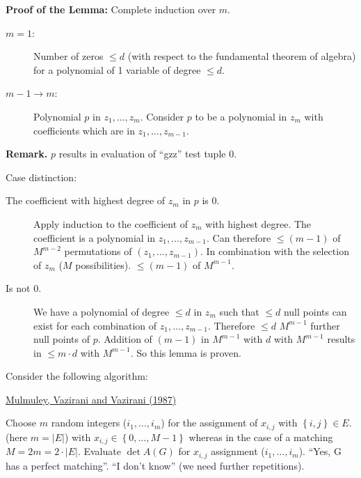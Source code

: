 \documentclass[a4paper]{article}
\newcommand{\set}[1]{\left\{#1\right\}}
\begin{document}
\textbf{Proof of the Lemma:} Complete induction over $m$.
\begin{description}
  \item[$m=1$:]
    Number of zeros $\leq d$ (with respect to the fundamental theorem of algebra)
    for a polynomial of 1 variable of degree $\leq d$.
  \item[$m-1 \rightarrow m$:]
    Polynomial $p$ in $z_1, \ldots, z_m$. Consider $p$ to be a polynomial in $z_m$ with coefficients
    which are in $z_1, \ldots, z_{m-1}$.
\end{description}

\textbf{Remark.}
  $p$ results in evaluation of ``gzz'' test tuple 0.

Case distinction:
\begin{description}
  \item[The coefficient with highest degree of $z_m$ in $p$ is 0.]
    Apply induction to the coefficient of $z_m$ with highest degree.
    The coefficient is a polynomial in $z_1, \ldots, z_{m-1}$.
    Can therefore $\leq (m-1)$ of $M^{m-2}$ permutations of $(z_1, \ldots, z_{m-1})$.
    In combination with the selection of $z_m$ ($M$ possibilities).
    $\leq (m-1)$ of $M^{m-1}$.
  \item[Is not $0$.]
    We have a polynomial of degree $\leq d$ in $z_m$ such that $\leq d$ null points
    can exist for each combination of $z_1, \ldots, z_{m-1}$.
    Therefore $\leq d$ $M^{m-1}$ further null points of $p$.
    Addition of $(m-1)$ in $M^{m-1}$ with $d$ with $M^{m-1}$ results in $\leq m\cdot d$ with $M^{m-1}$.
    So this lemma is proven.
\end{description}

Consider the following algorithm:
\begin{algorithm}
\caption{\href{http://www.cs.cmu.edu/afs/cs/academic/class/15859-f04/www/scribes/lec3.pdf}{Mulmuley, Vazirani and Vazirani (1987)}}
\begin{algorithmic}[1]
  \State
    Choose $m$ random integers ($i_1, \ldots, i_m$) for the assignment of $x_{i,j}$ with $\set{i,j} \in E$.
    (here $m = |E|$) with $x_{i,j} \in \set{0, \ldots, M-1}$ whereas in the case of a matching $M = 2m = 2\cdot |E|$.
  \State Evaluate $\det A(G)$ for $x_{i,j}$ assignment  ($i_1, \ldots, i_m$).
    \State \Return ``Yes, G has a perfect matching''.
  \Else
   \State \Return ``I don't know'' (we need further repetitions).
  \EndIf
\end{algorithmic}
\end{algorithm}
\end{document}
